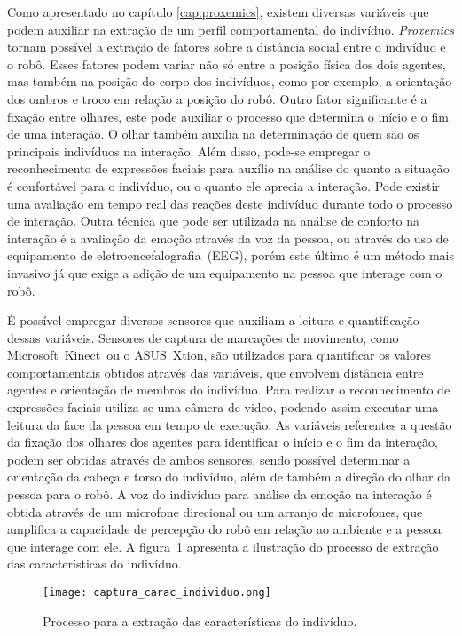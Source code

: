 Como apresentado no capítulo \ref{cap:proxemics}, existem diversas variáveis que podem auxiliar na extração de um perfil comportamental do indivíduo. \emph{Proxemics} tornam possível a extração de fatores sobre a distância social entre o indivíduo e o robô. Esses fatores podem variar não só entre a posição física dos dois agentes, mas também na posição do corpo dos indivíduos, como por exemplo, a orientação dos ombros e troco em relação a posição do robô. Outro fator significante é a fixação entre olhares, este pode auxiliar o processo que determina o início e o fim de uma interação. O olhar também auxilia na determinação de quem são os principais indivíduos na interação. Além disso, pode-se empregar o reconhecimento de expressões faciais para auxílio na análise do quanto a situação é confortável para o indivíduo, ou o quanto ele aprecia a interação. Pode existir uma avaliação em tempo real das reações deste indivíduo durante todo o processo de interação. Outra técnica que pode ser utilizada na análise de conforto na interação é a avaliação da emoção através da voz da pessoa, ou através do uso de equipamento de eletroencefalografia~(EEG), porém este último é um método mais invasivo já que exige a adição de um equipamento na pessoa que interage com o robô.

É possível empregar diversos sensores que auxiliam a leitura e quantificação dessas variáveis. Sensores de captura de marcações de movimento, como Microsoft\textregistered\ Kinect\textregistered\ ou o ASUS\textregistered\ Xtion\textregistered, são utilizados para quantificar os valores comportamentais obtidos através das variáveis, que envolvem distância entre agentes e orientação de membros do indivíduo. Para realizar o reconhecimento de expressões faciais utiliza-se uma câmera de video, podendo assim executar uma leitura da face da pessoa em tempo de execução. As variáveis referentes a questão da fixação dos olhares dos agentes para identificar o início e o fim da interação, podem ser obtidas através de ambos sensores, sendo possível determinar a orientação da cabeça e torso do indivíduo, além de também a direção do olhar da pessoa para o robô. A voz do indivíduo para análise da emoção na interação é obtida através de um microfone direcional ou um arranjo de microfones, que amplifica a capacidade de percepção do robô em relação ao ambiente e a pessoa que interage com ele. A figura~\ref{fig:capturacaracteristicas} apresenta a ilustração do processo de extração das características do indivíduo.

\begin{figure}[ht!]
	\centering
	\begin{minipage}{0.8\textwidth}
		\caption{Processo para a extração das características do indivíduo.}
		\texttt{[image: captura\_carac\_individuo.png]}
		\label{fig:capturacaracteristicas}
	\end{minipage}
\end{figure}

